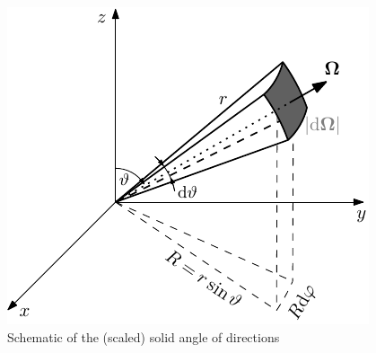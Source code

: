 \begin{figure}[!hbt]
    \centering
    \includegraphics[scale=1.275]{element}
    \caption[Solid angle]{Schematic of the (scaled) solid angle of directions}
    \label{fig:element}
\end{figure}

